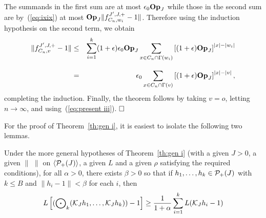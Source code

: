 The summands in the first sum are at most 
$\epsilon_0 {\bf Op}_J$ while those in the second sum are by~(\ref{eq:ixix}) at 
most ${\bf Op}_J \|f^{J',J , +}_{C_n , w_i}    - 1\| $.
Therefore using the induction hypothesis on the second term, we obtain
\begin{eqnarray*}
\|f^{J',J , +}_{C_n , v} - 1\| 
& \leq & \sum_{i=1}^k (1 + \epsilon) \epsilon_0 {\bf Op}_J \sum_{x \in C_n \cap 
   \Gamma (w_i)} \left [ (1 + \epsilon ) {\bf Op}_J \right ]^{|x| - |w_i|} \\[2ex]
& = & \epsilon_0 \sum_{x \in C_n \cap \Gamma (v)} \left [ (1 + \epsilon) 
   {\bf Op}_J \right ]^{|x| - |v|} ,
\end{eqnarray*}
completing the induction. 
Finally, the theorem follows by taking $v = o$, letting $n \rightarrow
\infty$, and using~(\ref{eq:present iii}). $\qed$

For the proof of Theorem~\ref{th:gen i}, it is easiest to isolate the 
following two lemmas.

\begin{lem} \label{lem:first}
Under the more general hypotheses of Theorem~\ref{th:gen i}
(with a given $J >0$, a given $\|\,\,\|$ on $\langle{\cal P}_+(J)\rangle$, a given $L$ and 
a given $\rho$ satisfying the required conditions), 
for all $\alpha>0$,
there exists $\beta>0$ so that if $h_1,\ldots, h_k\in {\cal P}_+(J)$ with
$k\le B$ and $\|h_i-1\| < \beta$ for each $i$, then
$$
L \left [ ({\bigodot}_k ({\cal K}_J h_1 , \ldots , {\cal K}_J h_k)) - 1 \right ] 
   \geq {1 \over 1 + \alpha} \sum_{i=1}^k L ({\cal K}_J h_i - 1) 
$$
\end{lem}

